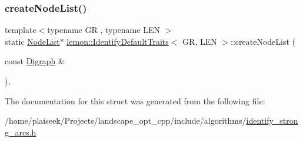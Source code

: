 \subsubsection{\texorpdfstring{create\+Node\+List()}{createNodeList()}}
{\footnotesize\ttfamily template$<$typename GR , typename L\+EN $>$ \\
static \hyperlink{structlemon_1_1_identify_default_traits_ac7ceaa832e1553cd7fda8d3edc14023e}{Node\+List}$\ast$ \hyperlink{structlemon_1_1_identify_default_traits}{lemon\+::\+Identify\+Default\+Traits}$<$ GR, L\+EN $>$\+::create\+Node\+List (\begin{DoxyParamCaption}\item[{const \hyperlink{structlemon_1_1_identify_default_traits_a5fddb27be8d17b86b2c4f94e72b8a8da}{Digraph} \&}]{ }\end{DoxyParamCaption})\hspace{0.3cm}{\ttfamily [inline]}, {\ttfamily [static]}}



The documentation for this struct was generated from the following file\+:\begin{DoxyCompactItemize}
\item 
/home/plaiseek/\+Projects/landscape\+\_\+opt\+\_\+cpp/include/algorithms/\hyperlink{identify__strong__arcs_8h}{identify\+\_\+strong\+\_\+arcs.\+h}\end{DoxyCompactItemize}
